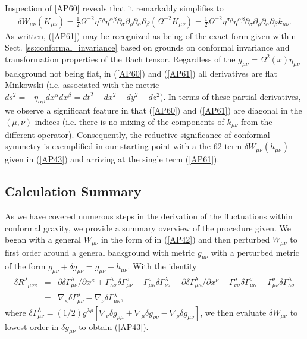 %
Inspection of \eqref{AP60} reveals that it remarkably simplifies to
%
\begin{eqnarray}
\delta W_{\mu\nu}(K_{\mu\nu})=\frac{1}{2}\Omega^{-2}\eta^{\sigma\rho}\eta^{\alpha\beta}\partial_{\sigma}\partial_{\rho} \partial_{\alpha}\partial_{\beta}(\Omega^{-2}K_{\mu\nu})
=\frac{1}{2}\Omega^{-2}\eta^{\sigma\rho}\eta^{\alpha\beta}\partial_{\sigma}\partial_{\rho} \partial_{\alpha}\partial_{\beta}k_{\mu\nu}.
\label{AP61}
\end{eqnarray}
%
As written, (\ref{AP61}) may be recognized as being of the exact form given within Sect. \ref{ss:conformal_invariance} based on grounds on conformal invariance and transformation properties of the Bach tensor. Regardless of the $g_{\mu\nu}=\Omega^2(x)\eta_{\mu\nu}$ background not being flat, in (\ref{AP60}) and (\ref{AP61}) all derivatives are flat Minkowski (i.e. associated with the metric $ds^2=-\eta_{\alpha\beta}dx^{\alpha}dx^{\beta}=dt^2-dx^2-dy^2-dz^2$). In terms of these partial derivatives, we observe a significant feature in that (\ref{AP60}) and (\ref{AP61}) are diagonal in the $(\mu,\nu)$ indices (i.e. there is no mixing of the components of $k_{\mu\nu}$ from the different operator).  Consequently, the reductive significance of conformal symmetry is exemplified in our starting point with a the 62 term $\delta W_{\mu\nu}(h_{\mu\nu})$ given in (\ref{AP43}) and arriving at the single term (\ref{AP61}).

\subsection{Calculation Summary}
\label{ss:summary_cgauge}

As we have covered numerous steps in the derivation of the fluctuations within conformal gravity, we provide a summary overview of the procedure given. We began with a general $W_{\mu\nu}$ in the form of in (\ref{AP42}) and then perturbed $W_{\mu\nu}$ to first order around a general background  with metric $g_{\mu\nu}$ with a perturbed metric of the form  $g_{\mu\nu}+\delta g_{\mu\nu}=g_{\mu\nu}+h_{\mu\nu}$. With the identity 
%
\begin{eqnarray}
\delta R^{\lambda}_{\phantom{\lambda}\mu\nu\kappa}&=&
\partial \delta\Gamma^{\lambda}_{\mu\nu}/\partial x^{\kappa}
+\Gamma^{\lambda}_{\kappa\sigma}\delta\Gamma^{\sigma}_{\mu\nu}
-\Gamma^{\sigma}_{\mu\kappa}\delta\Gamma^{\lambda}_{\nu\sigma}
-\partial \delta\Gamma^{\lambda}_{\mu\kappa}/\partial x^{\nu}
-\Gamma^{\lambda}_{\nu\sigma}\delta\Gamma^{\sigma}_{\mu\kappa}
+\Gamma^{\sigma}_{\mu\nu}\delta\Gamma^{\lambda}_{\kappa\sigma}
\nonumber\\
&=&
\nabla_{\kappa}\delta\Gamma^{\lambda}_{\mu\nu}
-\nabla_{\nu}\delta\Gamma^{\lambda}_{\mu\kappa},
\end{eqnarray}
%
where $\delta\Gamma^{\lambda}_{\mu\nu}=(1/2)g^{\lambda \rho}[\nabla_{\nu}\delta g_{\rho\mu}+\nabla_{\mu}\delta g_{\rho\nu}-\nabla_{\rho}\delta g_{\mu\nu}]$, we then evaluate $\delta W_{\mu\nu}$ to lowest order in $\delta g_{\mu\nu}$ to obtain (\ref{AP43}). 

